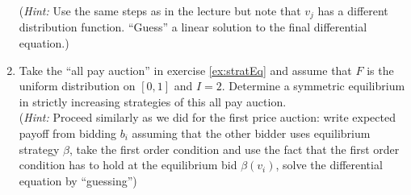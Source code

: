 \documentclass[a4paper,12pt]{article}
\begin{document}
\begin{enumerate}
  (\emph{Hint:} Use the same steps as in the lecture but note that $v_j$ has a different distribution function. ``Guess'' a linear solution to the final differential equation.)
\item\label{ex:allPay} Take the ``all pay auction'' in exercise \ref{ex:stratEq} and assume that $F$ is the uniform distribution on $[0,1]$ and $I=2$. Determine a symmetric equilibrium in strictly increasing strategies of this all pay auction. \\
  (\emph{Hint: }Proceed similarly as we did for the first price auction: write expected payoff from bidding $b_i$ assuming that the other bidder uses equilibrium strategy $\beta$, take the first order condition and use the fact that the first order condition has to hold at the equilibrium bid $\beta(v_i)$, solve the differential equation by ``guessing'')

\end{enumerate}
\end{document}
